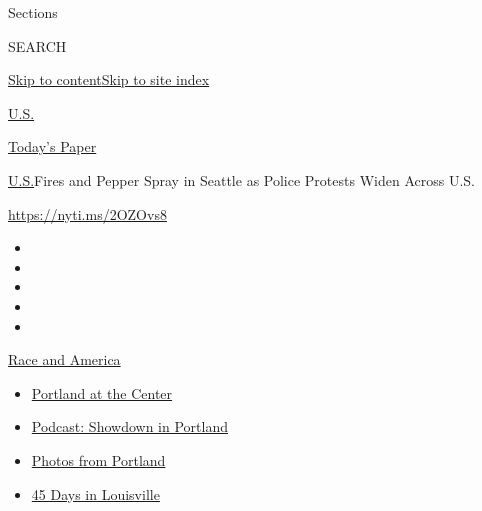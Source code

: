 Sections

SEARCH

\protect\hyperlink{site-content}{Skip to
content}\protect\hyperlink{site-index}{Skip to site index}

\href{https://www.nytimes3xbfgragh.onion/section/us}{U.S.}

\href{https://myaccount.nytimes3xbfgragh.onion/auth/login?response_type=cookie\&client_id=vi}{}

\href{https://www.nytimes3xbfgragh.onion/section/todayspaper}{Today's
Paper}

\href{/section/us}{U.S.}\textbar{}Fires and Pepper Spray in Seattle as
Police Protests Widen Across U.S.

\url{https://nyti.ms/2OZOvs8}

\begin{itemize}
\item
\item
\item
\item
\item
\end{itemize}

\href{https://www.nytimes3xbfgragh.onion/news-event/george-floyd-protests-minneapolis-new-york-los-angeles?action=click\&pgtype=Article\&state=default\&module=styln-george-floyd\&region=TOP_BANNER\&context=storylines_menu}{Race
and America}

\begin{itemize}
\tightlist
\item
  \href{https://www.nytimes3xbfgragh.onion/2020/07/24/us/portland-oregon-protests-white-race.html?action=click\&pgtype=Article\&state=default\&module=styln-george-floyd\&region=TOP_BANNER\&context=storylines_menu}{Portland
  at the Center}
\item
  \href{https://www.nytimes3xbfgragh.onion/2020/07/23/podcasts/the-daily/portland-protests.html?action=click\&pgtype=Article\&state=default\&module=styln-george-floyd\&region=TOP_BANNER\&context=storylines_menu}{Podcast:
  Showdown in Portland}
\item
  \href{https://www.nytimes3xbfgragh.onion/2020/07/21/us/portland-photos-protests.html?action=click\&pgtype=Article\&state=default\&module=styln-george-floyd\&region=TOP_BANNER\&context=storylines_menu}{Photos
  from Portland}
\item
  \href{https://www.nytimes3xbfgragh.onion/interactive/2020/07/16/us/black-lives-matter-protests-louisville-breonna-taylor.html?action=click\&pgtype=Article\&state=default\&module=styln-george-floyd\&region=TOP_BANNER\&context=storylines_menu}{45
  Days in Louisville}
\end{itemize}

